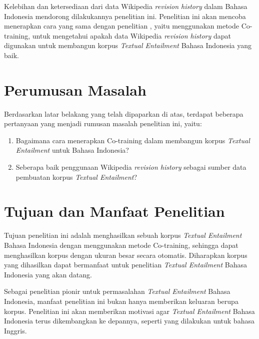 Kelebihan dan ketersediaan dari data Wikipedia \textit{revision history} dalam Bahasa Indonesia mendorong dilakukannya penelitian ini. Penelitian ini akan mencoba menerapkan cara yang sama dengan penelitian \cite{zanzottoRTEexpand}, yaitu menggunakan metode Co-training, untuk mengetahui apakah data Wikipedia \textit{revision history} dapat digunakan untuk membangun korpus \textit{Textual Entailment} Bahasa Indonesia yang baik.

\section{Perumusan Masalah}
Berdasarkan latar belakang yang telah dipaparkan di atas, terdapat beberapa pertanyaan yang menjadi rumusan masalah penelitian ini, yaitu:
\begin{enumerate}
	\item Bagaimana cara menerapkan Co-training dalam membangun korpus \textit{Textual Entailment} untuk Bahasa Indonesia?
	\item Seberapa baik penggunaan Wikipedia \textit{revision history} sebagai sumber data pembuatan korpus \textit{Textual Entailment}?
\end{enumerate}

\section{Tujuan dan Manfaat Penelitian}
Tujuan penelitian ini adalah menghasilkan sebuah korpus \textit{Textual Entailment} Bahasa Indonesia dengan menggunakan metode Co-training, sehingga dapat menghasilkan korpus dengan ukuran besar secara otomatis. Diharapkan korpus yang dihasilkan dapat bermanfaat untuk penelitian \textit{Textual Entailment} Bahasa Indonesia yang akan datang.

Sebagai penelitian pionir untuk permasalahan \textit{Textual Entailment} Bahasa Indonesia, manfaat penelitian ini bukan hanya memberikan keluaran berupa korpus. Penelitian ini akan memberikan motivasi agar \textit{Textual Entailment} Bahasa Indonesia terus dikembangkan ke depannya, seperti yang dilakukan untuk bahasa Inggris.

